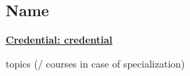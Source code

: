 \subsection{Name}
\vspace{\topsep}
\href{certifcation_link}{\bf Credential: credential}
\begin{tightitemize}
\item topics (/ courses in case of specialization)
\end{tightitemize}

\sectionspace